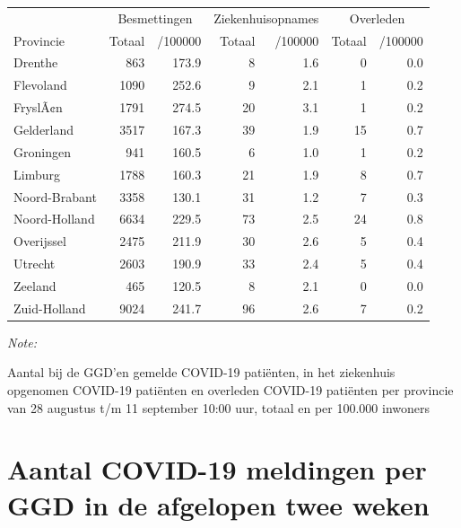 \documentclass[
  english,
  man,floatsintext]{apa6}
\begin{document}
\begin{table}
\centering
\begin{threeparttable}
\begin{tabular}{lrrrrrr}
\toprule
\multicolumn{1}{c}{ } & \multicolumn{2}{c}{Besmettingen} & \multicolumn{2}{c}{Ziekenhuisopnames} & \multicolumn{2}{c}{Overleden} \\
\cmidrule(l{3pt}r{3pt}){2-3} \cmidrule(l{3pt}r{3pt}){4-5} \cmidrule(l{3pt}r{3pt}){6-7}
Provincie & Totaal & /100000 & Totaal & /100000 & Totaal & /100000\\
\midrule
Drenthe & 863 & 173.9 & 8 & 1.6 & 0 & 0.0\\
Flevoland & 1090 & 252.6 & 9 & 2.1 & 1 & 0.2\\
FryslÃ¢n & 1791 & 274.5 & 20 & 3.1 & 1 & 0.2\\
Gelderland & 3517 & 167.3 & 39 & 1.9 & 15 & 0.7\\
Groningen & 941 & 160.5 & 6 & 1.0 & 1 & 0.2\\
Limburg & 1788 & 160.3 & 21 & 1.9 & 8 & 0.7\\
Noord-Brabant & 3358 & 130.1 & 31 & 1.2 & 7 & 0.3\\
Noord-Holland & 6634 & 229.5 & 73 & 2.5 & 24 & 0.8\\
Overijssel & 2475 & 211.9 & 30 & 2.6 & 5 & 0.4\\
Utrecht & 2603 & 190.9 & 33 & 2.4 & 5 & 0.4\\
Zeeland & 465 & 120.5 & 8 & 2.1 & 0 & 0.0\\
Zuid-Holland & 9024 & 241.7 & 96 & 2.6 & 7 & 0.2\\
\bottomrule
\end{tabular}
\begin{tablenotes}
\item \textit{Note: } 
\item Aantal bij de GGD’en gemelde COVID-19 patiënten, in het ziekenhuis opgenomen COVID-19 patiënten en overleden COVID-19 patiënten per provincie van 28 augustus t/m 11 september 10:00 uur, totaal en per 100.000 inwoners
\end{tablenotes}
\end{threeparttable}
\end{table}

\newpage

\hypertarget{aantal-covid-19-meldingen-per-ggd-in-de-afgelopen-twee-weken}{%
\section{Aantal COVID-19 meldingen per GGD in de afgelopen twee weken}\label{aantal-covid-19-meldingen-per-ggd-in-de-afgelopen-twee-weken}}
\end{document}
